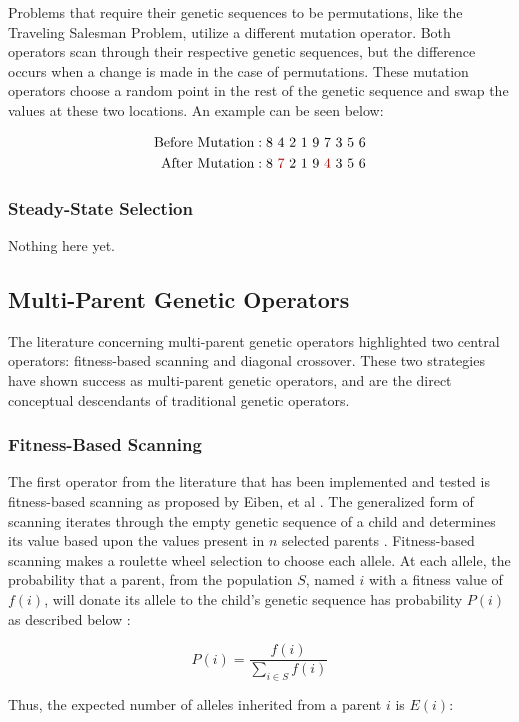 Problems that require their genetic sequences to be permutations, like the Traveling Salesman Problem, utilize a different mutation operator. Both operators scan through their respective genetic sequences, but the difference occurs when a change is made in the case of permutations. These mutation operators choose a random point in the rest of the genetic sequence and swap the values at these two locations. An example can be seen below:

\begin{align*}
\text{Before Mutation} &: 8~4~2~1~9~7~3~5~6 			\\
\text{After Mutation} &:  8~{\color{myred}7}~2~1~9~{\color{myred}4}~3~5~6		
\end{align*}

\subsubsection*{Steady-State Selection}
Nothing here yet.

\subsection*{Multi-Parent Genetic Operators}
The literature concerning multi-parent genetic operators highlighted two central operators: fitness-based scanning and diagonal crossover. These two strategies have shown success as multi-parent genetic operators, and are the direct conceptual descendants of traditional genetic operators.

\subsubsection*{Fitness-Based Scanning}
The first operator from the literature that has been implemented and tested is fitness-based scanning as proposed by Eiben, et al \cite{Eiben94}. The generalized form of scanning iterates through the empty genetic sequence of a child and determines its value based upon the values present in $n$ selected parents \cite{Eiben91}. Fitness-based scanning makes a roulette wheel selection to choose each allele. At each allele, the probability that a parent, from the population $S$, named $i$ with a fitness value of $f(i)$, will donate its allele to the child's genetic sequence has probability $P(i)$ as described below \cite{Eiben94}: 

\[ P(i) = \frac{f(i)}{\sum\limits_{i \in S} f(i)} \]

\noindent Thus, the expected number of alleles inherited from a parent $i$ is $E(i)$\cite{Eiben94}:

